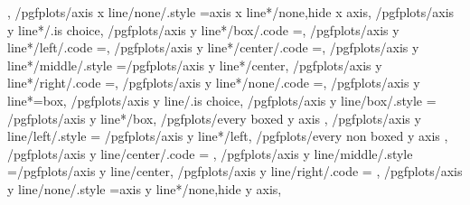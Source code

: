 {{			%
		\fi
	},
	/pgfplots/axis x line/none/.style	={axis x line*/none,hide x axis},
	/pgfplots/axis y line*/.is choice,
	/pgfplots/axis y line*/box/.code	={\def\pgfplots@yaxislinesnum{0}\def\pgfplots@ytickposnum{0}},
	/pgfplots/axis y line*/left/.code	={\def\pgfplots@yaxislinesnum{1}\def\pgfplots@ytickposnum{1}\let\pgfplots@yticklabel@pos\pgfutil@empty},
	/pgfplots/axis y line*/center/.code	={\def\pgfplots@yaxislinesnum{2}\def\pgfplots@ytickposnum{2}\let\pgfplots@yticklabel@pos\pgfutil@empty},
	/pgfplots/axis y line*/middle/.style	={/pgfplots/axis y line*/center},
	/pgfplots/axis y line*/right/.code	={\def\pgfplots@yaxislinesnum{3}\def\pgfplots@ytickposnum{3}\let\pgfplots@yticklabel@pos\pgfutil@empty},
	/pgfplots/axis y line*/none/.code	={\def\pgfplots@yaxislinesnum{4}\def\pgfplots@ytickposnum{4}\let\pgfplots@yticklabel@pos\pgfutil@empty},
	/pgfplots/axis y line*=box,
	/pgfplots/axis y line/.is choice,
	/pgfplots/axis y line/box/.style	={
		/pgfplots/axis y line*/box,
		/pgfplots/every boxed y axis
	},
	/pgfplots/axis y line/left/.style	={
		/pgfplots/axis y line*/left,
		/pgfplots/every non boxed y axis
	},
	/pgfplots/axis y line/center/.code	={
		\ifnum{} %
		\else
		\fi
	},
	/pgfplots/axis y line/middle/.style	={/pgfplots/axis y line/center},
	/pgfplots/axis y line/right/.code	={%
		\ifnum{}
		\fi
	},%
	/pgfplots/axis y line/none/.style	={axis y line*/none,hide y axis},
%
}
